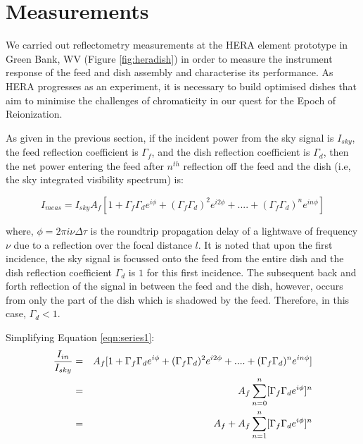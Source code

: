 \documentclass[12pt,preprint]{aastex}
\begin{document}
\section{Measurements}
We carried out reflectometry measurements at the HERA element prototype in Green
Bank, WV (Figure \ref{fig:heradish}) in order to measure the instrument response of the feed and dish assembly and characterise its performance. As HERA progresses as
an experiment, it is necessary to build optimised dishes that aim to minimise the
challenges of chromaticity in our quest for the Epoch of Reionization.

As given in the previous section, if the incident power from the sky signal is $I_{sky}$, the feed
reflection coefficient is $\Gamma_{f}$, and the dish reflection
coefficient is $\Gamma_{d}$, then the net power entering the feed after
$n^{th}$ reflection off the feed and the dish (i.e, the sky integrated visibility spectrum) is:

\begin{equation}\label{eqn:series1}
I_{meas} =  I_{sky}A_{f}[1+ \Gamma_{f}\Gamma_{d} e^{i\phi}+ (\Gamma_{f}\Gamma_{d})^2e^{i2\phi}+ ....+ (\Gamma_{f}\Gamma_{d})^{n}e^{in\phi}]
\end{equation}

where, $\phi = 2\pi i\nu \Delta \tau$ is the roundtrip propagation delay of a lightwave of frequency $\nu$ due to a reflection over the focal distance $l$. It is noted that upon the first incidence, the sky signal is focussed onto the feed from the entire dish and the dish reflection coefficient $\Gamma_{d}$ is $1$ for this first incidence. The subsequent back and forth reflection of the signal in between the feed and the dish, however, occurs from only the part of the dish which is shadowed by the feed. Therefore, in this case, $\Gamma_{d} < 1$.

Simplifying Equation \ref{eqn:series1}:
\begin{eqnarray}\label{eqn:ratio1}
{I_{in} \over I_{sky} } & = & A_{f}[1+ \Gamma_{f}\Gamma_{d} e^{i\phi}+ (\Gamma_{f}\Gamma_{d})^2e^{i2\phi}+ ....+ (\Gamma_{f}\Gamma_{d})^{n}e^{in\phi}] \nonumber\\
      & = & A_{f} \displaystyle\sum\limits_{n=0}^{n} [\Gamma_{f}\Gamma_{d}e^{i \phi}]^{n}\nonumber\\
      & = & A_{f}+A_{f} \displaystyle\sum\limits_{n=1}^{n} [\Gamma_{f}\Gamma_{d}e^{i \phi}]^{n}
\end{eqnarray}
\end{document}

